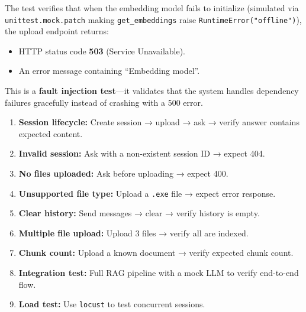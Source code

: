 \documentclass[12pt,a4paper]{article}
\begin{document}
\begin{interviewbox}
\end{interviewbox}
\begin{answerbox}
The test verifies that when the embedding model fails to initialize (simulated via \texttt{unittest.mock.patch} making \texttt{get\_embeddings} raise \texttt{RuntimeError("offline")}), the upload endpoint returns:
\begin{itemize}
  \item HTTP status code \textbf{503} (Service Unavailable).
  \item An error message containing ``Embedding model''.
\end{itemize}
This is a \textbf{fault injection test}—it validates that the system handles dependency failures gracefully instead of crashing with a 500 error.
\end{answerbox}

\begin{interviewbox}
\end{interviewbox}
\begin{answerbox}
\begin{enumerate}
  \item \textbf{Session lifecycle:} Create session → upload → ask → verify answer contains expected content.
  \item \textbf{Invalid session:} Ask with a non-existent session ID → expect 404.
  \item \textbf{No files uploaded:} Ask before uploading → expect 400.
  \item \textbf{Unsupported file type:} Upload a \texttt{.exe} file → expect error response.
  \item \textbf{Clear history:} Send messages → clear → verify history is empty.
  \item \textbf{Multiple file upload:} Upload 3 files → verify all are indexed.
  \item \textbf{Chunk count:} Upload a known document → verify expected chunk count.
  \item \textbf{Integration test:} Full RAG pipeline with a mock LLM to verify end-to-end flow.
  \item \textbf{Load test:} Use \texttt{locust} to test concurrent sessions.
\end{enumerate}
\end{answerbox}
\end{document}
